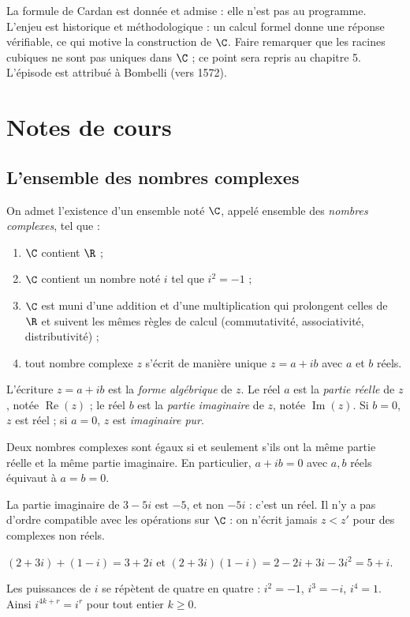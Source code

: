 \begin{teachernote}
La formule de Cardan est donnée et admise : elle n'est pas au programme. L'enjeu est historique et méthodologique : un calcul formel donne une réponse vérifiable, ce qui motive la construction de $\C$. Faire remarquer que les racines cubiques ne sont pas uniques dans $\C$ ; ce point sera repris au chapitre 5. L'épisode est attribué à Bombelli (vers 1572).
\end{teachernote}

\mxnewpage
\section{Notes de cours}
\subsection{L'ensemble des nombres complexes}
\begin{definition}[Ensemble $\C$]
On admet l'existence d'un ensemble noté $\C$, appelé ensemble des \emph{nombres complexes}, tel que :
\begin{enumerate}
\item $\C$ contient $\R$ ;
\item $\C$ contient un nombre noté $i$ tel que $i^2=-1$ ;
\item $\C$ est muni d'une addition et d'une multiplication qui prolongent celles de $\R$ et suivent les mêmes règles de calcul (commutativité, associativité, distributivité) ;
\item tout nombre complexe $z$ s'écrit de manière unique $z=a+ib$ avec $a$ et $b$ réels.
\end{enumerate}
L'écriture $z=a+ib$ est la \emph{forme algébrique} de $z$. Le réel $a$ est la \emph{partie réelle} de $z$, notée $\operatorname{Re}(z)$ ; le réel $b$ est la \emph{partie imaginaire} de $z$, notée $\operatorname{Im}(z)$. Si $b=0$, $z$ est réel ; si $a=0$, $z$ est \emph{imaginaire pur}.
\end{definition}
\begin{theorem}
Deux nombres complexes sont égaux si et seulement s'ils ont la même partie réelle et la même partie imaginaire. En particulier, $a+ib=0$ avec $a,b$ réels équivaut à $a=b=0$.
\end{theorem}
\begin{pitfall}
La partie imaginaire de $3-5i$ est $-5$, et non $-5i$ : c'est un réel. Il n'y a pas d'ordre compatible avec les opérations sur $\C$ : on n'écrit jamais $z<z'$ pour des complexes non réels.
\end{pitfall}
\begin{example}
$(2+3i)+(1-i)=3+2i$ et $(2+3i)(1-i)=2-2i+3i-3i^2=5+i$.\par
Les puissances de $i$ se répètent de quatre en quatre : $i^2=-1$, $i^3=-i$, $i^4=1$. Ainsi $i^{4k+r}=i^r$ pour tout entier $k\ge0$.
\end{example}

